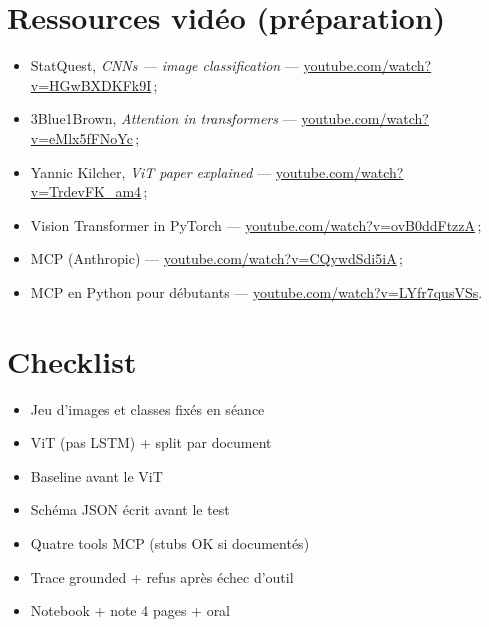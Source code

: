 \documentclass[11pt,a4paper]{article}
\begin{document}
\section{Ressources vidéo (préparation)}

\begin{itemize}
  \item StatQuest, \emph{CNNs --- image classification} ---
        \href{https://www.youtube.com/watch?v=HGwBXDKFk9I}{youtube.com/watch?v=HGwBXDKFk9I}\,;
  \item 3Blue1Brown, \emph{Attention in transformers} ---
        \href{https://www.youtube.com/watch?v=eMlx5fFNoYc}{youtube.com/watch?v=eMlx5fFNoYc}\,;
  \item Yannic Kilcher, \emph{ViT paper explained} ---
        \href{https://www.youtube.com/watch?v=TrdevFK_am4}{youtube.com/watch?v=TrdevFK\_am4}\,;
  \item Vision Transformer in PyTorch ---
        \href{https://www.youtube.com/watch?v=ovB0ddFtzzA}{youtube.com/watch?v=ovB0ddFtzzA}\,;
  \item MCP (Anthropic) ---
        \href{https://www.youtube.com/watch?v=CQywdSdi5iA}{youtube.com/watch?v=CQywdSdi5iA}\,;
  \item MCP en Python pour débutants ---
        \href{https://www.youtube.com/watch?v=LYfr7qusVSs}{youtube.com/watch?v=LYfr7qusVSs}.
\end{itemize}

\section{Checklist}

\begin{itemize}
  \item[$\square$] Jeu d'images et classes fixés en séance
  \item[$\square$] ViT (pas LSTM) + split par document
  \item[$\square$] Baseline avant le ViT
  \item[$\square$] Schéma JSON écrit avant le test
  \item[$\square$] Quatre tools MCP (stubs OK si documentés)
  \item[$\square$] Trace grounded + refus après échec d'outil
  \item[$\square$] Notebook + note 4 pages + oral
\end{itemize}
\end{document}
